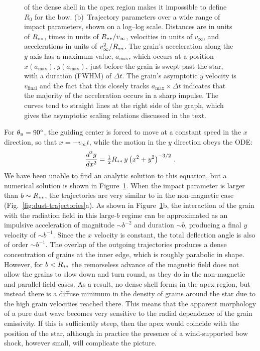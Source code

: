 \begin{figure}
{    of the dense shell in the apex region makes it impossible to
    define \(R_0\) for the bow.  (b)~Trajectory parameters over a wide
    range of impact parameters, shown on a log--log scale. Distances
    are in units of \(R_{**}\), times in units of
    \(R_{**} / v_\infty\), velocities in units of \(v_\infty\), and
    accelerations in units of \(v_\infty^2 / R_{**}\). The grain's
    acceleration along the \(y\) axis has a maximum value,
    \(a_{\text{max}}\), which occurs at a position
    \(x(a_{\text{max}}), y(a_{\text{max}})\), just before the grain is
    swept past the star, with a duration (FWHM) of \(\Delta t\).  The
    grain's asymptotic \(y\) velocity is \(v_{\text{final}}\) and the
    fact that this closely tracks \(a_{\text{max}} \times \Delta t\) indicates
    that the majority of the acceleration occurs in a sharp impulse.
    The curves tend to straight lines at the right side of the graph,
    which gives the asymptotic scaling relations discussed in the
    text.}
  \label{fig:inertia-thB90}
\end{figure}


For \(\theta_{\scriptscriptstyle\text{B}} = \ang{90}\), the guiding center is forced to move at a
constant speed in the \(x\) direction, so that \(x = -v_\infty t\), while
the motion in the \(y\) direction obeys the ODE:
\begin{equation}
  \label{eq:ode-perp-bfield}
  \frac{d^2 y}{d x^2} = \tfrac12 R_{**}  \,
  y \, \bigl( x^2 + y^2\bigr)^{-3/2} \ .
\end{equation}
We have been unable to find an analytic solution to this equation, but
a numerical solution is shown in Figure~\ref{fig:inertia-thB90}.  When
the impact parameter is larger than \(b \sim R_{**}\), the
trajectories are very similar to in the non-magnetic case
(Fig.~\ref{fig:dust-trajectories}a).  As shown in
Figure~\ref{fig:inertia-thB90}b, the interaction of the grain with the
radiation field in this large-\(b\) regime can be approximated as an
impulsive acceleration of magnitude \(\sim b^{-2}\) and duration
\(\sim b\), producing a final \(y\) velocity of \(\sim b^{-1}\).  Since the
\(x\) velocity is constant, the total deflection angle is also of
order \(\sim b^{-1}\).  The overlap of the outgoing trajectories produces
a dense concentration of grains at the inner edge, which is roughly
parabolic in shape.  However, for \(b < R_{**}\) the remorseless
advance of the magnetic field does not allow the grains to slow down
and turn round, as they do in the non-magnetic and parallel-field
cases.  As a result, no dense shell forms in the apex region, but
instead there is a diffuse minimum in the density of grains around the
star due to the high grain velocities reached there.  This means that
the apparent morphology of a pure dust wave becomes very sensitive to
the radial dependence of the grain emissivity.  If this is
sufficiently steep, then the apex would coincide with the position of
the star, although in practice the presence of a wind-supported bow
shock, however small, will complicate the picture.




